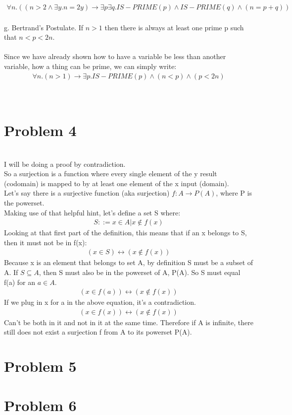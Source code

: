 \documentclass{article}
\begin{document}
\begin {align*}
\forall n. ((n > 2 \wedge \exists y. n = 2y) \rightarrow \exists p \exists q. IS-PRIME(p) \wedge IS-PRIME(q) \wedge (n = p + q))
\end {align*}
\\
g. Bertrand's Postulate. If $n > 1$ then there is always at least one prime p such that $n < p < 2n$. 
\\\\
Since we have already shown how to have a variable be less than another variable, how a thing can be prime, we can simply write:
\begin {align*}
\forall n. (n > 1) \rightarrow \exists p. IS-PRIME(p) \wedge (n < p) \wedge (p < 2n)
\end {align*}
\\\\

\section{Problem 4}
\\
I will be doing a proof by contradiction.
\\
So a surjection is a function where every single element of the y result (codomain) is mapped to by at least one element of the x input (domain).
\\
Let's say there is a surjective function (aka surjection) $f: A \rightarrow P(A)$, where P is the powerset.  
\\
Making use of that helpful hint, let's define a set S where:
\begin {align*}
S ::= x \in A | x \not \in f(x)
\end {align*}
Looking at that first part of the definition, this means that if an x belongs to S, then it must not be in f(x):
\\
\begin {align*}
(x \in S) \leftrightarrow (x \not \in f(x))
\end {align*}
Because x is an element that belongs to set A, by definition S must be a subset of A. If $S \subseteq A$, then S must also be in the powerset of A, P(A). So S must equal f(a) for an $a \in A$.
\begin {align*}
(x \in f(a)) \leftrightarrow (x \not \in f(x))
\end {align*}
If we plug in x for a in the above equation, it's a contradiction. 
\begin {align*}
(x \in f(x)) \leftrightarrow (x \not \in f(x))
\end {align*}
Can't be both in it and not in it at the same time. Therefore if A is infinite, there still does not exist a surjection f from A to its powerset P(A). 
\section{Problem 5}

\section{Problem 6}
\end{document}

